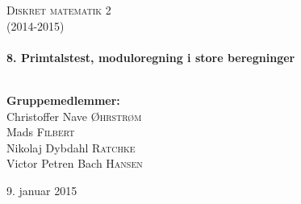 \begin{titlepage}
\begin{center}

\textsc{\Large Diskret matematik 2\\[0.3cm](2014-2015)}\\[0.5cm]

\HRule \\[0.4cm]
{ \LARGE \bfseries 8. Primtalstest, moduloregning i store beregninger}\\[0.4cm]

\HRule \\[1.2cm]

\begin{minipage}{0.6\textwidth}
  \begin{flushleft}
    \textbf{Gruppemedlemmer:}\\
    Christoffer Nave \textsc{Øhrstrøm}\\
    Mads \textsc{Filbert}\\
    Nikolaj Dybdahl \textsc{Ratchke}\\
    Victor Petren Bach \textsc{Hansen}
  \end{flushleft}
\end{minipage}

\end{center}

\begin{center}

\vfill

{\large 9. januar 2015}

\end{center}
\end{titlepage}
